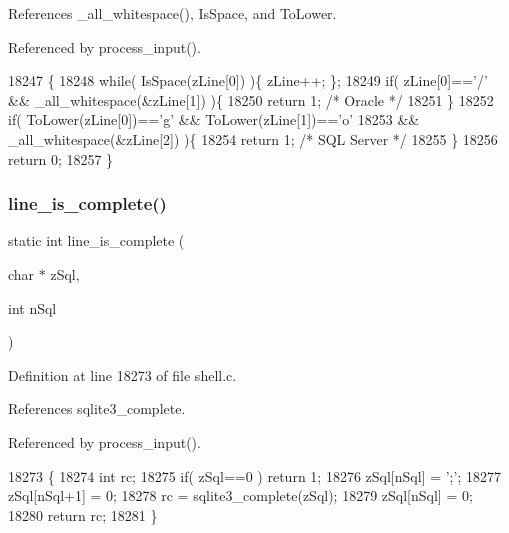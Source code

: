 References \+\_\+all\+\_\+whitespace(), Is\+Space, and To\+Lower.



Referenced by process\+\_\+input().


\begin{DoxyCode}
18247                                                         \{
18248   \textcolor{keywordflow}{while}( IsSpace(zLine[0]) )\{ zLine++; \};
18249   \textcolor{keywordflow}{if}( zLine[0]==\textcolor{charliteral}{'/'} && _all_whitespace(&zLine[1]) )\{
18250     \textcolor{keywordflow}{return} 1;  \textcolor{comment}{/* Oracle */}
18251   \}
18252   \textcolor{keywordflow}{if}( ToLower(zLine[0])==\textcolor{charliteral}{'g'} && ToLower(zLine[1])==\textcolor{charliteral}{'o'}
18253          && _all_whitespace(&zLine[2]) )\{
18254     \textcolor{keywordflow}{return} 1;  \textcolor{comment}{/* SQL Server */}
18255   \}
18256   \textcolor{keywordflow}{return} 0;
18257 \}
\end{DoxyCode}
\mbox{\label{shell_8c_a1df76818e31435c7931c2887ff412f1a}} 
\subsubsection{line\+\_\+is\+\_\+complete()}
{\footnotesize\ttfamily static int line\+\_\+is\+\_\+complete (\begin{DoxyParamCaption}\item[{char $\ast$}]{z\+Sql,  }\item[{int}]{n\+Sql }\end{DoxyParamCaption})\hspace{0.3cm}{\ttfamily [static]}}



Definition at line 18273 of file shell.\+c.



References sqlite3\+\_\+complete.



Referenced by process\+\_\+input().


\begin{DoxyCode}
18273                                                  \{
18274   \textcolor{keywordtype}{int} rc;
18275   \textcolor{keywordflow}{if}( zSql==0 ) \textcolor{keywordflow}{return} 1;
18276   zSql[nSql] = \textcolor{charliteral}{';'};
18277   zSql[nSql+1] = 0;
18278   rc = sqlite3_complete(zSql);
18279   zSql[nSql] = 0;
18280   \textcolor{keywordflow}{return} rc;
18281 \}
\end{DoxyCode}
\mbox{\label{shell_8c_ac2f6e16d8f424eedf80e07c021ab1c0f}} 

